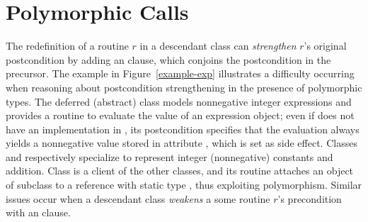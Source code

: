 \section{Polymorphic Calls}
\label{sec:m-polymorphic}


The redefinition of a routine $r$ in a descendant class can \emph{strengthen} $r$'s original postcondition by adding an  clause, which conjoins the postcondition in the precursor.
The example in Figure~\ref{example-exp} illustrates a difficulty occurring when reasoning about postcondition strengthening in the presence of polymorphic types.
The deferred (abstract) class  models nonnegative integer expressions and provides a routine  to evaluate the value of an expression object; even if  does not have an implementation in , its postcondition specifies that the evaluation always yields a nonnegative value stored in attribute , which is set as side effect.
Classes  and  respectively specialize  to represent integer (nonnegative) constants and addition.
Class  is a client of the other classes, and its  routine attaches an object of subclass  to a reference with static type , thus exploiting polymorphism.
Similar issues occur when a descendant class \emph{weakens} a some routine $r$'s precondition with an  clause.


